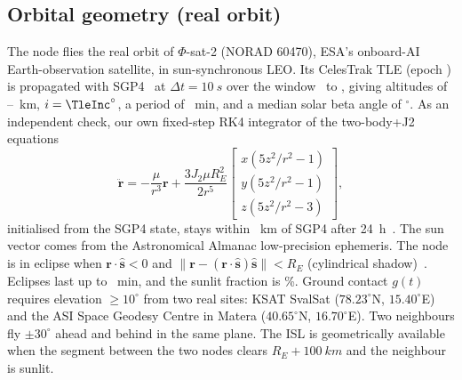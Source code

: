 \documentclass[conference]{IEEEtran}
\theoremstyle{remark}
\begin{document}
\subsection{Orbital geometry (real orbit)}
The node flies the real orbit of $\Phi$-sat-2 (NORAD 60470), ESA's onboard-AI Earth-observation satellite, in sun-synchronous LEO. Its CelesTrak TLE (epoch \TleEpoch) is propagated with SGP4~\cite{vallado2006sgp4} at $\Delta t=\SI{10}{s}$ over the window \DateStart\ to \DateEnd, giving altitudes of \AltMin--\AltMax~km, $i=\TleInc^\circ$, a period of \PeriodMin~min, and a median solar beta angle of \BetaDeg$^\circ$. As an independent check, our own fixed-step RK4 integrator of the two-body+J2 equations
\begin{equation}
\ddot{\mathbf r}=-\frac{\mu}{r^3}\mathbf r+\frac{3J_2\mu R_E^2}{2r^5}\!\begin{bmatrix}x(5z^2/r^2-1)\\y(5z^2/r^2-1)\\z(5z^2/r^2-3)\end{bmatrix},
\end{equation}
initialised from the SGP4 state, stays within \RKerr~km of SGP4 after 24~h~\cite{vallado2013}. The sun vector comes from the Astronomical Almanac low-precision ephemeris. The node is in eclipse when $\mathbf r\cdot\hat{\mathbf s}<0$ and $\|\mathbf r-(\mathbf r\cdot\hat{\mathbf s})\hat{\mathbf s}\|<R_E$ (cylindrical shadow)~\cite{wertz1999smad}. Eclipses last up to \EclMax~min, and the sunlit fraction is \SunlitPct\%. Ground contact $g(t)$ requires elevation $\geq10^\circ$ from two real sites: KSAT SvalSat ($78.23^\circ$N, $15.40^\circ$E) and the ASI Space Geodesy Centre in Matera ($40.65^\circ$N, $16.70^\circ$E). Two neighbours fly $\pm30^\circ$ ahead and behind in the same plane. The ISL is geometrically available when the segment between the two nodes clears $R_E+\SI{100}{km}$ and the neighbour is sunlit.
\end{document}

